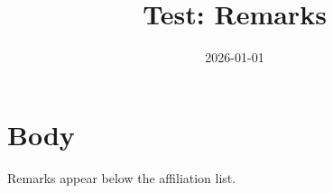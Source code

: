 \documentclass{article}
\title{Test: Remarks}
\date{2026-01-01}
\begin{document}
\maketitle
\section{Body}
Remarks appear below the affiliation list.
\end{document}
